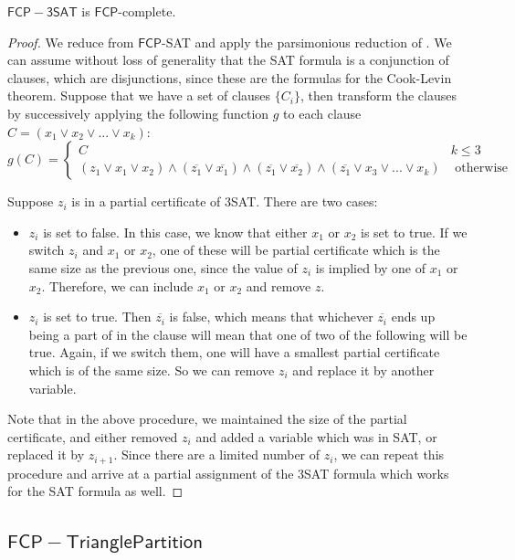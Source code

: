 \documentclass[runningheads,a4paper]{llncs}
\begin{document}
\begin{theorem}
$\mathsf{FCP-3SAT}$ is $\mathsf{FCP}$-complete.
\end{theorem}

\begin{proof}
We reduce from $\mathsf{FCP}$-SAT and apply the parsimonious reduction of \cite{yaleclass}. We can assume without loss of generality that the SAT formula is a conjunction of clauses, which are disjunctions, since these are the formulas for the Cook-Levin theorem. Suppose that we have a set of clauses $\{ C_i \}$, then transform the clauses by successively applying the following function $g$ to each clause $C = (x_1 \vee x_2 \vee ... \vee x_k)$:
\[ g(C) = \left\{ \begin{array}{cc} C & k \leq 3 \\
						    (z_1 \vee x_1 \vee x_2) \wedge (\overline{z_1} \vee \overline{x_1}) \wedge (\overline{z_1} \vee \overline{x_2}) \wedge (\overline{z_1} \vee x_3 \vee ... \vee x_k) & \text{ otherwise }\end{array} \right. \] 

Suppose $z_i$ is in a partial certificate of 3SAT. There are two cases:
\begin{itemize}
\item $z_i$ is set to false. In this case, we know that either $x_1$ or $x_2$ is set to true. If we switch $z_i$ and $x_1$ or $x_2$, one of these will be partial certificate which is the same size as the previous one, since the value of $z_i$ is implied by one of $x_1$ or $x_2$. Therefore, we can include $x_1$ or $x_2$ and remove $z$.
\item $z_i$ is set to true. Then $\overline{z_i}$ is false, which means that whichever $\overline{z_i}$ ends up being a part of in the clause will mean that one of two of the following will be true. Again, if we switch them, one will have a smallest partial certificate which is of the same size. So we can remove $z_i$ and replace it by another variable. 
\end{itemize}
Note that in the above procedure, we maintained the size of the partial certificate, and either removed $z_i$ and added a variable which was in SAT, or replaced it by $z_{i+1}$. Since there are a limited number of $z_i$, we can repeat this procedure and arrive at a partial assignment of the 3SAT formula which works for the SAT formula as well.
\end{proof}

\subsection{$\mathsf{FCP-Triangle Partition}$}
\end{document}
